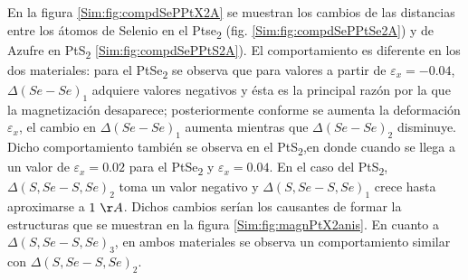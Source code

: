 \par En la figura \ref{Sim:fig:compdSePPtX2A} se muestran los cambios de las distancias entre los \'atomos de Selenio en el Ptse\textsubscript{2} (fig. \ref{Sim:fig:compdSePPtSe2A}) y de Azufre en PtS\textsubscript{2} \ref{Sim:fig:compdSePPtS2A}). El comportamiento es diferente en los dos materiales: para el PtSe\textsubscript{2} se observa que para valores a partir de  $\varepsilon_x = -0.04 $,  $\Delta (Se-Se)_1$ adquiere valores negativos y \'esta es la principal raz\'on por la que la magnetizaci\'on desaparece; posteriormente conforme se aumenta la deformación $\varepsilon_x$,  el cambio en $\Delta (Se-Se)_1$ aumenta mientras que $\Delta (Se-Se)_2$ disminuye. Dicho comportamiento tambi\'en se observa en el PtS\textsubscript{2},en donde cuando se llega a un valor de $\varepsilon_x= 0.02$ para el PtSe\textsubscript{2} y $\varepsilon_x= 0.04$. En el caso del PtS\textsubscript{2}, $\Delta (S,Se-S,Se)_2$ toma un valor negativo y $\Delta (S,Se-S,Se)_1$ crece hasta aproximarse a $1~\AA$. Dichos cambios ser\'ian los causantes de formar la estructuras que se muestran en la figura \ref{Sim:fig:magnPtX2anis}. En cuanto a $\Delta (S,Se-S,Se)_3$, en ambos materiales se observa un comportamiento similar con $\Delta (S,Se-S,Se)_2$.
